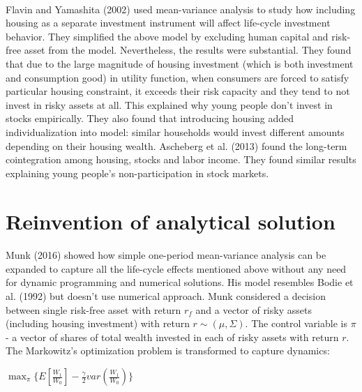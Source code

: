 \paragraph*{}Flavin and Yamashita (2002) used mean-variance analysis to study how including housing as a separate investment instrument will affect life-cycle investment behavior. They simplified the above model by excluding human capital and risk-free asset from the model. Nevertheless, the results were substantial. They found that due to the large magnitude of housing investment (which is both investment and consumption good) in utility function, when consumers are forced to satisfy particular housing constraint, it exceeds their risk capacity and they tend to not invest in risky assets at all. This explained why young people don't invest in stocks empirically. They also found that introducing housing added individualization into model: similar households would invest different amounts depending on their housing wealth. Ascheberg et al. (2013) found the long-term cointegration among housing, stocks and labor income. They found similar results explaining young people's non-participation in stock markets. 



\section{Reinvention of analytical solution}


\paragraph*{}Munk (2016) showed how simple one-period mean-variance analysis can be expanded to capture all the life-cycle effects mentioned above without any need for dynamic programming and numerical solutions. His model resembles Bodie et al. (1992) but doesn't use numerical approach. Munk considered a decision between single risk-free asset with return $r_f$ and a vector of risky assets (including housing investment) with return $r \sim (\mu, \Sigma)$. The control variable is $\pi$ - a vector of shares of total wealth invested in each of risky assets with return $r$. The Markowitz's optimization problem is transformed to capture dynamics:


\begin{center}
	$ \displaystyle\max_{\pi} \{ E[\frac{W_1}{W_0}] - \frac{\gamma}{2} var(\frac{W_1}{W_0}) \} $
\end{center}

